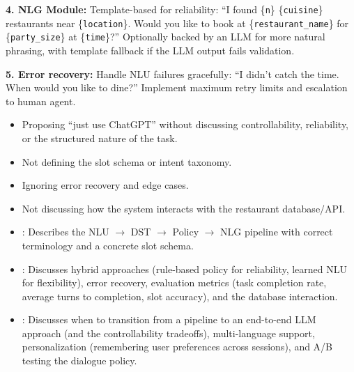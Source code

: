 \begin{interviewq}
\textbf{4. NLG Module:}
Template-based for reliability: ``I found \{\texttt{n}\} \{\texttt{cuisine}\} restaurants near
\{\texttt{location}\}.  Would you like to book at \{\texttt{restaurant\_name}\} for
\{\texttt{party\_size}\} at \{\texttt{time}\}?''  Optionally backed by an LLM for more
natural phrasing, with template fallback if the LLM output fails validation.

\textbf{5. Error recovery:}
Handle NLU failures gracefully: ``I didn't catch the time.  When would you like to dine?''
Implement maximum retry limits and escalation to human agent.

\redflags
\begin{itemize}
    \item Proposing ``just use ChatGPT'' without discussing controllability, reliability,
    or the structured nature of the task.
    \item Not defining the slot schema or intent taxonomy.
    \item Ignoring error recovery and edge cases.
    \item Not discussing how the system interacts with the restaurant database/API.
\end{itemize}


\goodgreat
\begin{itemize}
    \item {}: Describes the NLU $\to$ DST $\to$ Policy $\to$ NLG pipeline with
    correct terminology and a concrete slot schema.
    \item {}: Discusses hybrid approaches (rule-based policy for reliability,
    learned NLU for flexibility), error recovery, evaluation metrics (task completion rate,
    average turns to completion, slot accuracy), and the database interaction.
    \item {}: Discusses when to transition from a pipeline to an end-to-end LLM
    approach (and the controllability tradeoffs), multi-language support, personalization
    (remembering user preferences across sessions), and A/B testing the dialogue policy.
\end{itemize}

\end{interviewq}

